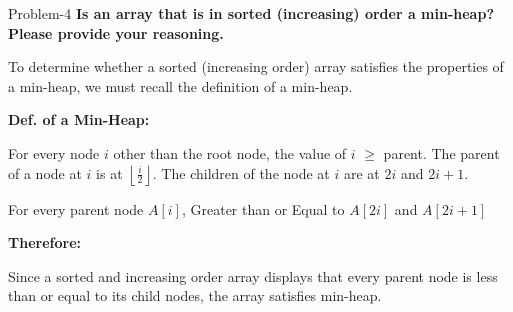 \begin{problem}{}{Problem-4}
	\textbf{Is an array that is in sorted (increasing) order a min-heap? Please provide your reasoning.}
	
	To determine whether a sorted (increasing order) array satisfies the properties of a min-heap, we must recall the definition of a min-heap.
	
	\textbf{Def. of a Min-Heap:}
	
	For every node \( i \) other than the root node, the value of \( i \) $\ge$ parent.
	The parent of a node at \( i \) is at \( \left\lfloor \frac{i}{2} \right\rfloor \). The children of the node at \( i \) are at \( 2i \) and \( 2i + 1 \).
	
	For every parent node \( A[i] \), Greater than or Equal to \( A[2i] \) and \( A[2i + 1] \)
	
	\textbf{Therefore:}
	
	Since a sorted and increasing order array displays that every parent node is less than or equal to its child nodes, the array satisfies min-heap.
	
\end{problem}
